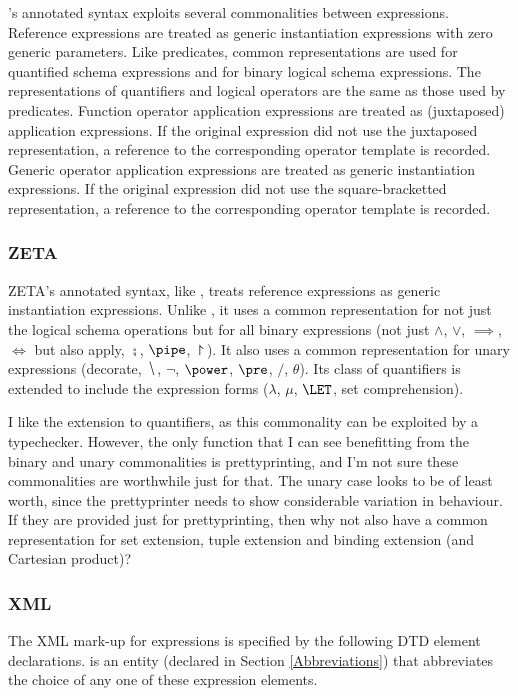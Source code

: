 \documentclass[a4paper,10pt]{article}
\def\Zeta{{\sf Z{\small E}T{\small A}}}
\begin{document}
\CADiZ's annotated syntax exploits several commonalities between expressions.
Reference expressions are treated as generic instantiation expressions
with zero generic parameters.
Like predicates, common representations are used for
quantified schema expressions and for binary logical schema expressions.
The representations of quantifiers and logical operators are
the same as those used by predicates.
Function operator application expressions
are treated as (juxtaposed) application expressions.
If the original expression did not use the juxtaposed representation,
a reference to the corresponding operator template is recorded.
Generic operator application expressions
are treated as generic instantiation expressions.
If the original expression did not use the square-bracketted representation,
a reference to the corresponding operator template is recorded.

\subsubsection{\Zeta}

\Zeta's annotated syntax, like \CADiZ, treats reference expressions
as generic instantiation expressions.
Unlike \CADiZ, it uses a common representation for
not just the logical schema operations
but for all binary expressions
(not just $\land$, $\lor$, $\implies$, $\iff$ but also
apply, $\semi$, $\pipe$, $\project$).
It also uses a common representation for unary expressions
(decorate, $\hide$, $\lnot$, $\power$, $\pre$, $/$, $\theta$).
Its class of quantifiers is extended to include the expression forms
($\lambda$, $\mu$, $\LET$, set comprehension).

I like the extension to quantifiers,
as this commonality can be exploited by a typechecker.
However, the only function that I can see benefitting from
the binary and unary commonalities is prettyprinting,
and I'm not sure these commonalities are worthwhile just for that.
The unary case looks to be of least worth,
since the prettyprinter needs to show considerable variation in behaviour.
If they are provided just for prettyprinting,
then why not also have a common representation for
set extension, tuple extension and binding extension (and Cartesian product)?

\subsubsection{XML}

The XML mark-up for expressions is
specified by the following DTD element declarations.
 is an entity (declared in Section \ref{Abbreviations})
that abbreviates the choice of any one of these expression elements.
\end{document}
